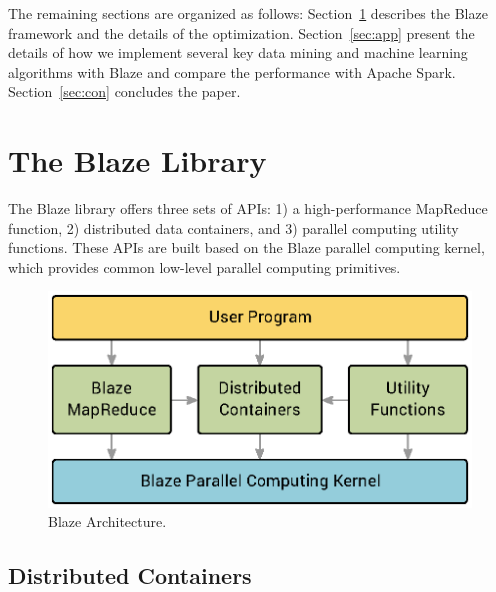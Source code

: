 The remaining sections are organized as follows:
Section~\ref{sec:blaze} describes the Blaze framework and the details of the optimization.
Section~\ref{sec:app} present the details of how we implement several key data mining and machine learning algorithms with Blaze and compare the performance with Apache Spark.
Section~\ref{sec:con} concludes the paper.

\section{The Blaze Library}
\label{sec:blaze}
The Blaze library offers three sets of APIs: 1) a high-performance MapReduce function, 2) distributed data containers, and 3) parallel computing utility functions.
These APIs are built based on the Blaze parallel computing kernel, which provides common low-level parallel computing primitives.



\begin{figure}
  \begin{center}
  \includegraphics[width=0.7\linewidth]{figs/arch0.eps}
  \end{center}
  \vspace{-0.2cm}
  \caption{Blaze Architecture.
  }
  \label{fig:mrdiff}
\end{figure}

\subsection{Distributed Containers}

